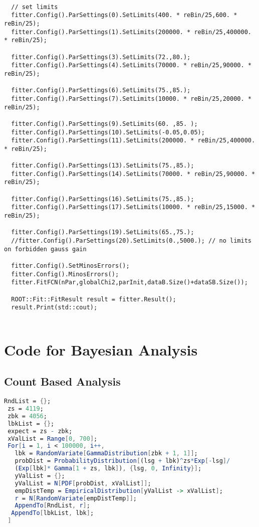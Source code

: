 \begin{appendices}
\begin{lstlisting}
  
  // set limits 
  fitter.Config().ParSettings(0).SetLimits(400. * reBin/25,600. * reBin/25);
  fitter.Config().ParSettings(1).SetLimits(200000. * reBin/25,400000. * reBin/25);

  fitter.Config().ParSettings(3).SetLimits(72.,80.);
  fitter.Config().ParSettings(4).SetLimits(70000. * reBin/25,90000. * reBin/25);

  fitter.Config().ParSettings(6).SetLimits(75.,85.);
  fitter.Config().ParSettings(7).SetLimits(10000. * reBin/25,20000. * reBin/25);

  fitter.Config().ParSettings(9).SetLimits(60. ,85. );
  fitter.Config().ParSettings(10).SetLimits(-0.05,0.05);
  fitter.Config().ParSettings(11).SetLimits(200000. * reBin/25,400000. * reBin/25);
  
  fitter.Config().ParSettings(13).SetLimits(75.,85.);
  fitter.Config().ParSettings(14).SetLimits(70000. * reBin/25,90000. * reBin/25);

  fitter.Config().ParSettings(16).SetLimits(75.,85.);
  fitter.Config().ParSettings(17).SetLimits(10000. * reBin/25,15000. * reBin/25);

  fitter.Config().ParSettings(19).SetLimits(65.,75.);
  //fitter.Config().ParSettings(20).SetLimits(0.,5000.); // no limits on forbidden gauss gain
  
  fitter.Config().SetMinosErrors();
  fitter.Config().MinosErrors();
  fitter.FitFCN(nPar,globalChi2,parInit,dataB.Size()+dataSB.Size());
  
  ROOT::Fit::FitResult result = fitter.Result();
  result.Print(std::cout);


\end{lstlisting}


\chapter{Code for Bayesian Analysis}
\label{chap:bayesCode}

\section{Count Based Analysis}

\begin{lstlisting}[language=Mathematica]
 RndList = {};
 zs = 4119;
 zbk = 4056;
 lbkList = {};
 expect = zs - zbk;
 xValList = Range[0, 700];
 For[i = 1, i < 100000, i++,
   lbk = RandomVariate[GammaDistribution[zbk + 1, 1]];
   probDist = ProbabilityDistribution[(lsg + lbk)^zs*Exp[-lsg]/
   (Exp[lbk]* Gamma[1 + zs, lbk]), {lsg, 0, Infinity}];
   yValList = {};
   yValList = N[PDF[probDist, xValList]];
   empDistTemp = EmpiricalDistribution[yValList -> xValList];
   r = N[RandomVariate[empDistTemp]];
   AppendTo[RndList, r];
  AppendTo[lbkList, lbk];
 ]
 

\end{lstlisting}
\end{appendices}
